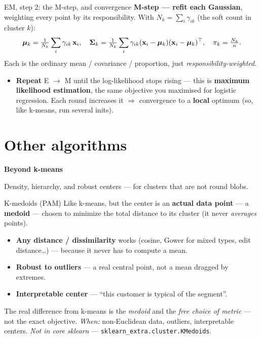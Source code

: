 \documentclass[aspectratio=169]{beamer}
\newcommand{\sectiontransition}[2]{%
  \begin{frame}[plain]
    \vfill
    \begin{center}
      {\Large\color{popblue}\textbf{#1}}\\[0.9em]
      \begin{minipage}{0.82\textwidth}\centering\small #2 \end{minipage}
    \end{center}
    \vfill
  \end{frame}}
\begin{document}
\begin{frame}{EM, step 2: the M-step, and convergence}
  \textbf{M-step --- refit each Gaussian}, weighting every point by its responsibility. With
  $N_k=\sum_i \gamma_{ik}$ (the soft count in cluster $k$):
  \[
    \bm{\mu}_k = \tfrac{1}{N_k}\sum_i \gamma_{ik}\,\mathbf{x}_i, \quad
    \bm{\Sigma}_k = \tfrac{1}{N_k}\sum_i \gamma_{ik}(\mathbf{x}_i-\bm{\mu}_k)(\mathbf{x}_i-\bm{\mu}_k)^\top, \quad
    \pi_k = \tfrac{N_k}{n}.
  \]
  Each is the ordinary mean / covariance / proportion, just \emph{responsibility-weighted}.
  \vfill
  \begin{itemize}\small
    \item \textbf{Repeat} E $\to$ M until the log-likelihood stops rising --- this is
      \textbf{maximum likelihood estimation}, the same objective you maximised for logistic
      regression. Each round increases it $\Rightarrow$ convergence to a \textbf{local} optimum
      (so, like k-means, run several inits).
  \end{itemize}
  \vfill
\end{frame}

\section{Other algorithms}
\sectiontransition{Beyond k-means}{Density, hierarchy, and robust centers --- for clusters that
are not round blobs.}

\begin{frame}{K-medoids (PAM)}
  Like k-means, but the center is an \textbf{actual data point} --- a \textbf{medoid} --- chosen to
  minimize the total distance to its cluster (it never \emph{averages} points).
  \begin{itemize}\small
    \item \textbf{Any distance / dissimilarity} works (cosine, Gower for mixed types, edit
      distance\dots) --- because it never has to compute a mean.
    \item \textbf{Robust to outliers} --- a real central point, not a mean dragged by extremes.
    \item \textbf{Interpretable center} --- ``this customer is typical of the segment''.
  \end{itemize}
  \vfill
  \footnotesize The real difference from k-means is the \emph{medoid} and the \emph{free choice of
  metric} --- not the exact objective. \emph{When:} non-Euclidean data, outliers, interpretable
  centers. \emph{Not in core sklearn} --- \texttt{sklearn\_extra.cluster.KMedoids}.
\end{frame}
\end{document}
